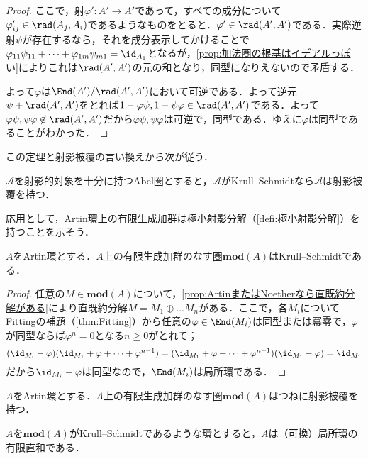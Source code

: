 \begin{proof}
	ここで，射$\varphi':A'\to A'$であって，すべての成分について$\varphi_{ij}'\in\rad(A_j,A_i)$であるようなものをとると．$\varphi'\in\rad(A',A')$である．実際逆射$\psi$が存在するなら，それを成分表示してかけることで$\varphi_{11}\psi_{11}+\dots+\varphi_{1m}\psi_{m1}=\id_{A_1}$となるが，\ref{prop:加法圏の根基はイデアルっぽい}によりこれは$\rad(A',A')$の元の和となり，同型になりえないので矛盾する．
	
	よって$\varphi$は$\End(A')/\rad(A',A')$において可逆である．よって逆元$\psi+\rad(A',A')$をとれば$1-\varphi\psi,1-\psi\varphi\in\rad(A',A')$である．よって$\varphi\psi,\psi\varphi\not\in\rad(A',A')$だから$\varphi\psi,\psi\varphi$は可逆で，同型である．ゆえに$\varphi$は同型であることがわかった．
\end{proof}

この定理と射影被覆の言い換えから次が従う．

\begin{cor}
	$\mathscr{A}$を射影的対象を十分に持つAbel圏とすると，$\mathscr{A}$がKrull--Schmidtなら$\mathscr{A}$は射影被覆を持つ．
\end{cor}

応用として，Artin環上の有限生成加群は極小射影分解（\ref{defi:極小射影分解}）を持つことを示そう．

\begin{prop}
	$A$をArtin環とする．$A$上の有限生成加群のなす圏$\mathbf{mod}(A)$はKrull--Schmidtである．
\end{prop}

\begin{proof}
	任意の$M\in\mathbf{mod}(A)$について，\ref{prop:ArtinまたはNoetherなら直既約分解がある}により直既約分解$M=M_1\oplus\dots M_n$がある．ここで，各$M_i$についてFittingの補題（\ref{thm:Fitting}）から任意の$\varphi\in\End(M_i)$は同型または冪零で，$\varphi$が同型ならば$\varphi^n=0$となる$n\geq0$がとれて；
	\[(\id_{M_i}-\varphi)(\id_{M_1}+\varphi+\dots+\varphi^{n-1})=(\id_{M_1}+\varphi+\dots+\varphi^{n-1})(\id_{M_1}-\varphi)=\id_{M_1}\]
	だから$\id_{M_i}-\varphi$は同型なので，$\End(M_i)$は局所環である．
\end{proof}

\begin{cor}
	$A$をArtin環とする．$A$上の有限生成加群のなす圏$\mathbf{mod}(A)$はつねに射影被覆を持つ．
\end{cor}

\begin{prop}
	$A$を$\mathbf{mod}(A)$がKrull--Schmidtであるような環とすると，$A$は（可換）局所環の有限直和である．
\end{prop}

